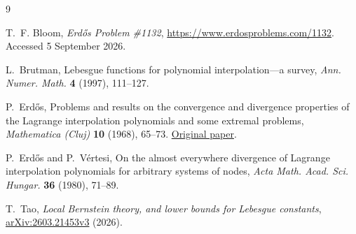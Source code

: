 \documentclass[11pt]{article}
\numberwithin{equation}{section}
\begin{document}
\begin{thebibliography}{9}

T.~F. Bloom,
\emph{Erd\H{o}s Problem \#1132},
\url{https://www.erdosproblems.com/1132}.
Accessed 5 September 2026.

L.~Brutman,
Lebesgue functions for polynomial interpolation---a survey,
\emph{Ann. Numer. Math.} \textbf{4} (1997), 111--127.

P.~Erd\H{o}s,
Problems and results on the convergence and divergence properties of
the Lagrange interpolation polynomials and some extremal problems,
\emph{Mathematica (Cluj)} \textbf{10} (1968), 65--73.
\href{https://combinatorica.hu/~p_erdos/1967-20.pdf}{Original paper}.

P.~Erd\H{o}s and P.~V\'ertesi,
On the almost everywhere divergence of Lagrange interpolation polynomials
for arbitrary systems of nodes,
\emph{Acta Math. Acad. Sci. Hungar.} \textbf{36} (1980), 71--89.

T.~Tao,
\emph{Local Bernstein theory, and lower bounds for Lebesgue constants},
\href{https://arxiv.org/abs/2603.21453v3}{arXiv:2603.21453v3}
(2026).

\end{thebibliography}
\end{document}
